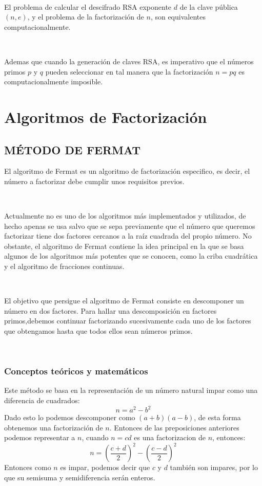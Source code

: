 \documentclass[11pt, conference]{IEEEtran}
\begin{document}
\

El problema de calcular el descifrado RSA exponente $d$ de la clave pública $(n, e)$, y el problema de la factorización de $n$, son equivalentes computacionalmente.

\

Ademas que cuando la generación de claves RSA, es imperativo que el números primos $p$ y $q$ pueden seleccionar en tal manera que la factorización $n = pq$ es computacionalmente imposible.

\section{Algoritmos de Factorización}
\subsection[Método de Fermat]{\textbf{MÉTODO DE FERMAT}}
\cite{c}El algoritmo de Fermat es un algoritmo de factorización especifico, es decir, el número a factorizar debe cumplir unos requisitos previos.
\cite{a}\cite{b}\cite{d}

\

Actualmente no es uno de los algoritmos más implementados y utilizados, de hecho apenas se usa salvo que se sepa previamente que el número que queremos factorizar tiene dos factores cercanos a la raíz cuadrada del propio número. No obstante, el algoritmo de Fermat contiene la idea principal en la que se basa algunos de los algoritmos más potentes que se conocen, como la criba cuadrática y el algoritmo de fracciones continuas.

\

El objetivo que persigue el algoritmo de Fermat consiste en descomponer un número en dos factores. Para hallar una descomposición en factores primos,debemos continuar factorizando sucesivamente cada uno de los factores que obtengamos hasta que todos ellos sean números primos.

\

\subsubsection[Conceptos teóricos y matemáticos]{\textbf{Conceptos teóricos y matemáticos}}
Este método se basa en la representación de un número natural impar como una diferencia de cuadrados:
\[n = a^2-b^2\]
Dado esto lo podemos descomponer como $(a+b)(a-b)$, de esta forma obtenemos una factorización de $n$. Entonces de las preposiciones anteriores podemos representar a  $n$, cuando $n=cd$ es una factorizacion de $n$, entonces:
\[n=\left(\frac{c+d}{2}\right)^2-\left(\frac{c-d}{2}\right)^2\]  
Entonces como $n$ es impar, podemos decir que $c$ y $d$ también son impares, por lo que su semisuma y semidiferencia serán enteros. 
\end{document}
